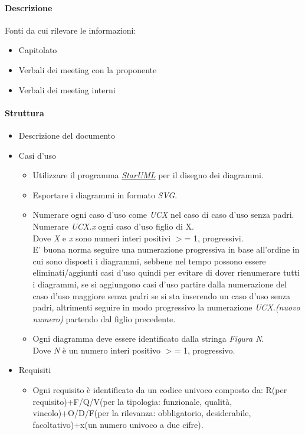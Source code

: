 \documentclass[a4paper, 12pt]{article}
\begin{document}
\paragraph{Descrizione}
Fonti da cui rilevare le informazioni:
\begin{itemize}
	\item Capitolato
	\item Verbali dei meeting con la proponente
	\item Verbali dei meeting interni
\end{itemize}
\paragraph{Struttura}
\begin{itemize}
	\item Descrizione del documento
	\item Casi d'uso
	\begin{itemize}
		\item Utilizzare il programma \href{https://staruml.io/}{\textit{\underline{StarUML}}} per il disegno dei diagrammi.
		\item Esportare i diagrammi in formato \textit{SVG}.
		\item Numerare ogni caso d'uso come \textit{UCX} nel caso di caso d'uso senza padri. 
		Numerare \textit{UCX.x} ogni caso d'uso figlio di X.\\
		Dove \textit{X} e \textit{x} sono numeri interi positivi $>$= 1, progressivi.\\
		E' buona norma seguire una numerazione progressiva in base all'ordine in cui sono 
		disposti i diagrammi, sebbene nel tempo possono essere eliminati/aggiunti casi d'uso
		quindi per evitare di dover rienumerare tutti i diagrammi, se si aggiungono casi d'uso
		partire dalla numerazione del caso d'uso maggiore senza padri se si sta inserendo un caso
		d'uso senza padri, altrimenti seguire in modo progressivo la numerazione \textit{UCX.(nuovo numero)}
		partendo dal figlio precedente.
		\item Ogni diagramma deve essere identificato dalla stringa \textit{Figura N}.\\
		Dove \textit{N} è un numero interi positivo $>$= 1, progressivo.
	\end{itemize}
	\item Requisiti
	\begin{itemize}
		\item Ogni requisito è identificato da un codice univoco composto da: R(per requisito)+F/Q/V(per la tipologia: 
		funzionale, qualità, vincolo)+O/D/F(per la rilevanza: obbligatorio, desiderabile, 
		facoltativo)+x(un numero univoco a due cifre).
	\end{itemize}
\end{itemize}
\end{document}
